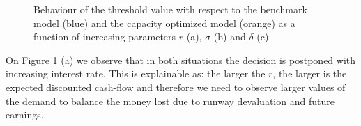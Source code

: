 


\begin{figure}[!htb]
	\begin{subfigmatrix}{3}
	\end{subfigmatrix}
	\caption{Behaviour of the threshold value with respect to the benchmark model (blue) and the capacity optimized model (orange) as a function of increasing parameters $r$ (a), $\sigma$ (b)  and $\delta$ (c).}
	\label{fig:sigm}
\end{figure}
On Figure \ref{fig:sigm} (a) we observe that in both situations the decision is postponed with increasing interest rate. This is explainable as: the larger the $r$, the larger is the expected discounted cash-flow and therefore we need to observe larger values of the demand to balance the money lost due to runway devaluation and future earnings.

